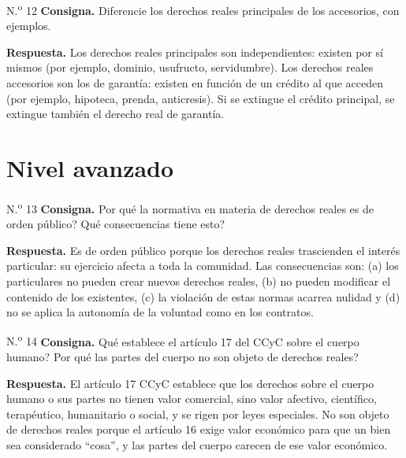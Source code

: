\documentclass[12pt,oneside]{book}
\begin{document}
\begin{exercise}{N.\textsuperscript{o} 12}
\textbf{Consigna.} Diferencie los derechos reales principales de los accesorios, con ejemplos.

\textbf{Respuesta.} Los derechos reales principales son independientes: existen por s\'i mismos (por ejemplo, dominio, usufructo, servidumbre). Los derechos reales accesorios son los de garant\'ia: existen en funci\'on de un cr\'edito al que acceden (por ejemplo, hipoteca, prenda, anticresis). Si se extingue el cr\'edito principal, se extingue tambi\'en el derecho real de garant\'ia.
\end{exercise}

\section{Nivel avanzado}

\begin{exercise}{N.\textsuperscript{o} 13}
\textbf{Consigna.} \textquestiondown Por qu\'e la normativa en materia de derechos reales es de orden p\'ublico? \textquestiondown Qu\'e consecuencias tiene esto?

\textbf{Respuesta.} Es de orden p\'ublico porque los derechos reales trascienden el inter\'es particular: su ejercicio afecta a toda la comunidad. Las consecuencias son: (a) los particulares no pueden crear nuevos derechos reales, (b) no pueden modificar el contenido de los existentes, (c) la violaci\'on de estas normas acarrea nulidad y (d) no se aplica la autonom\'ia de la voluntad como en los contratos.
\end{exercise}

\begin{exercise}{N.\textsuperscript{o} 14}
\textbf{Consigna.} \textquestiondown Qu\'e establece el art\'iculo 17 del CCyC sobre el cuerpo humano? \textquestiondown Por qu\'e las partes del cuerpo no son objeto de derechos reales?

\textbf{Respuesta.} El art\'iculo 17 CCyC establece que los derechos sobre el cuerpo humano o sus partes no tienen valor comercial, sino valor afectivo, cient\'ifico, terap\'eutico, humanitario o social, y se rigen por leyes especiales. No son objeto de derechos reales porque el art\'iculo 16 exige valor econ\'omico para que un bien sea considerado ``cosa'', y las partes del cuerpo carecen de ese valor econ\'omico.
\end{exercise}
\end{document}
